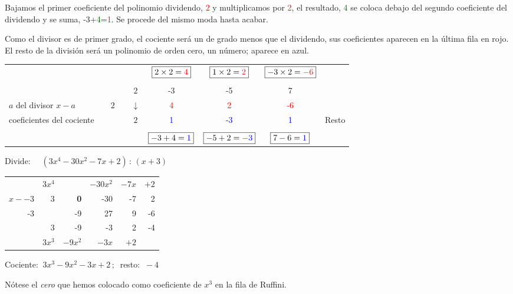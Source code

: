 Bajamos el primer coeficiente del polinomio dividendo, \textcolor{red}{$2$} y multiplicamos por \textcolor{Brown}{2}, el resultado, 	\textcolor{DarkGreen}{4} se coloca debajo del segundo coeficiente del dividendo y se suma, -3+\textcolor{DarkGreen}{4}=\textcolor{Red}{1}. Se procede del mismo moda hasta acabar.

Como el divisor es de primer grado, el cociente será un de grado menos que el dividendo, sus coeficientes aparecen en la última fila en rojo. El resto de la división será un polinomio de orden cero, un número; aparece en azul.

\begin{table}[H]
\centering
\begin{tabular}{llccccl}
 &  &  & $\boxed{2\times 2=\textcolor{red}{4}}$ & $\boxed{1\times 2=\textcolor{red}{2}}$ & $\boxed{-3\times 2=\textcolor{red}{-6}}$ & \multicolumn{1}{c}{} \\ \\
 & \multicolumn{1}{l|}{} & $\quad 2$ & -3 & -5 & 7 &  \\
$a$  del divisor $x-a$ & \multicolumn{1}{l|}{$\quad 2$} & $\quad \downarrow$ & \textcolor{red}{4} & \textcolor{red}{2} & \textcolor{red}{-6} &  \\ \cline{2-6}
coeficientes del cociente & \multicolumn{1}{l|}{} & $\quad 2$ & \textcolor{blue}{1} & \multicolumn{1}{c|}{\textcolor{blue}{-3}} & \textcolor{blue}{1} & Resto \\ \cline{6-6} \\
 &  &  & $\boxed{-3+4=\textcolor{blue}{1}}$ & $\boxed{-5+2=\textcolor{blue}{-3}}$ & $\boxed{7-6=\textcolor{blue}{1}}$ & \multicolumn{1}{c}{}
\end{tabular}
\end{table}


\vspace{5mm}
\begin{miejemplo}

Divide: $\quad (3x^4-30x^2-7x+2) 	\,  :\, (x+3) $

\begin{table}[H]
\centering
\begin{tabular}{rrrrrr}
 & \textcolor{gris}{$3x^4$} &  & \textcolor{gris}{$-30x^2$} & \textcolor{gris}{$-7x$} & \textcolor{gris}{$+2$} \\
\multicolumn{1}{r|}{\textcolor{gris}{$x-\boxed{-3}$}} & 3 & \textbf{0} & -30 & -7 & 2 \\
\multicolumn{1}{r|}{-3} &  & -9 & 27 & 9 & -6 \\ \hline
\multicolumn{1}{r|}{} & 3 & -9 & -3 & \multicolumn{1}{r|}{2} & -4 \\ \cline{6-6} 
 & \textcolor{gris}{$3x^3$} & \textcolor{gris}{$-9x^2$} & \textcolor{gris}{$-3x$} & \textcolor{gris}{$+2$} & 
\end{tabular}
\end{table}
Cociente: $\ 3x^3-9x^2-3x+2\, ; \ $ resto: $\ -4$ 

\vspace{2mm} Nótese el \emph{cero} que hemos colocado como coeficiente de $x^3$ en la fila de Ruffini.
\end{miejemplo}

